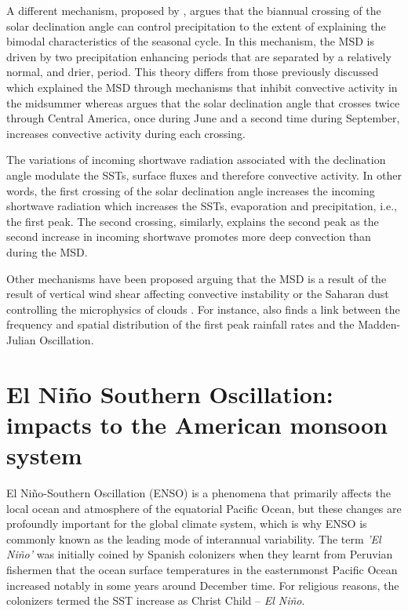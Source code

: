 A different mechanism, proposed by \cite{karnauskas2013}, argues that the biannual crossing of the solar declination angle can control precipitation to the extent of explaining the bimodal characteristics of the seasonal cycle. In this mechanism, the MSD is driven by two precipitation enhancing periods that are separated by a relatively normal, and drier, period. This theory differs from those previously discussed which explained the MSD through mechanisms that inhibit convective activity in the midsummer whereas \cite{karnauskas2013} argues that the solar declination angle that crosses twice through Central America, once during June and a second time during September, increases convective activity during each crossing. 

The variations of incoming shortwave radiation associated with the declination angle modulate the SSTs, surface fluxes and therefore convective activity. In other words, the first crossing of the solar declination angle increases the incoming shortwave radiation which increases the SSTs, evaporation and precipitation, i.e., the first peak. The second crossing, similarly, explains the second peak as the second increase in incoming shortwave promotes more deep convection than during the MSD. 



Other mechanisms have been proposed arguing that the MSD is a result of  the result of vertical wind shear affecting convective instability or the Saharan dust controlling  the microphysics of clouds \citep{angeles2010origins}.
For instance, \cite{perdigon2019} also finds a link between the frequency and spatial distribution of the first peak rainfall rates and the Madden-Julian Oscillation. 

\section{El Niño Southern Oscillation: impacts to the American monsoon system}
\label{sub:lit_enso}



 El Niño-Southern Oscillation (ENSO) is a phenomena that primarily affects the local ocean and atmosphere of the equatorial Pacific Ocean, but these changes are profoundly important for the global climate system, which is why ENSO is commonly known as the leading mode of interannual variability. 
 The term \textit{'El Niño'} was initially coined by Spanish colonizers when they learnt from Peruvian fishermen that the ocean surface temperatures in the easternmonst Pacific Ocean increased notably in some years around December time. 
 For religious reasons, the colonizers termed the SST increase as Christ Child -- \textit{El Niño}. 
 
